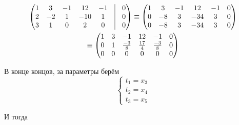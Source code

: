 \documentclass[12pt, a4paper]{article}
\begin{document}
    \begin{multline}
        \begin{pmatrix}
            1 & 3 & -1 & 12 & -1 & \vrule & 0 \\
            2 & -2 & 1 & -10 & 1 & \vrule & 0 \\
            3 & 1 & 0 & 2 & 0 & \vrule & 0
        \end{pmatrix} \equiv \left(\begin{matrix}
            1 & 3 & -1 & 12 & -1 & 0 \\
            0 & -8 & 3 & -34 & 3 & 0 \\
            0 & -8 & 3 & -34 & 3 & 0
        \end{matrix}\right) \\ \equiv \left(\begin{matrix}
            1 & 3 & -1 & 12 & -1 & 0 \\
            0 & 1 & \frac{-3}{8} & \frac{17}{4} & \frac{-3}{8} & 0 \\
            0 & 0 & 0 & 0 & 0 & 0
        \end{matrix}\right)
    \end{multline}

    В конце концов, за параметры берём 
    \begin{equation}
        \begin{cases}
            t_1 = x_3 \\
            t_2 = x_4 \\
            t_3 = x_5
        \end{cases}
    \end{equation}

    И тогда 
    
\end{document}
